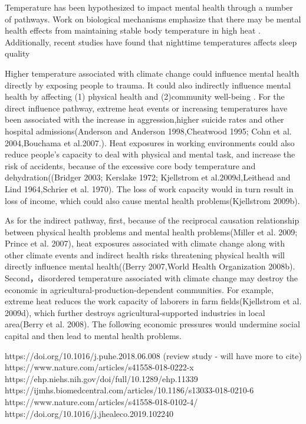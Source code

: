 \documentclass{article}
\begin{document}
Temperature has been hypothesized to impact mental health through a number of pathways.  Work on biological mechanisms emphasize that there may be mental health effects from maintaining stable body temperature in high heat \cite{Lohmus2018Jul}.  Additionally, recent studies have found that nighttime temperatures affects sleep quality \citep{Obradovich2017May, Mullins2019Dec}

Higher temperature associated with climate change could influence mental health directly by exposing people to trauma. It could also indirectly influence mental health by affecting (1) physical health and (2)community well-being \citep{RN1314}. For the direct influence pathway, extreme heat events or increasing temperatures have been associated with the increase in aggression,higher suicide rates and other hospital admissions(Anderson and Anderson 1998,Cheatwood 1995; Cohn et al. 2004,Bouchama et al.2007.). Heat exposures in working environments could also reduce people's capacity to deal with physical and mental task, and increase the risk of accidents, because of the excessive core body temperature and dehydration((Bridger 2003; Kerslake 1972; Kjellstrom et al.2009d,Leithead and Lind 1964,Schrier et al. 1970). The loss of work capacity would in turn result in loss of income, which could also cause mental health problems(Kjellstrom 2009b).%

As for the indirect pathway, first, because of the reciprocal causation relationship between physical health problems and mental health problems(Miller et al. 2009; Prince et al. 2007), heat exposures associated with climate change along with other climate events and indirect health risks threatening physical health will directly influence mental health((Berry 2007,World Health Organization 2008b). Second，disordered temperature associated with climate change may destroy the economic in agricultural-production-dependent communities. For example, extreme heat reduces the work capacity of laborers in farm fields(Kjellstrom et al. 2009d), which further destroys agricultural-supported industries in local area(Berry et al. 2008). The following economic pressures would undermine social capital and then lead to mental health problems.




https://doi.org/10.1016/j.puhe.2018.06.008 (review study - will have more to cite)
https://www.nature.com/articles/s41558-018-0222-x
https://ehp.niehs.nih.gov/doi/full/10.1289/ehp.11339
https://ijmhs.biomedcentral.com/articles/10.1186/s13033-018-0210-6
https://www.nature.com/articles/s41558-018-0102-4/
https://doi.org/10.1016/j.jhealeco.2019.102240
\end{document}
